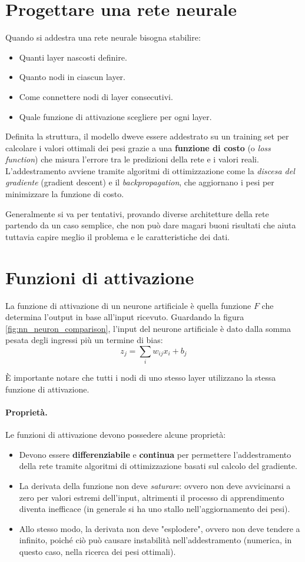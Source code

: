\section{Progettare una rete neurale}
Quando si addestra una rete neurale bisogna stabilire: 
\begin{itemize}
    \item Quanti layer nascosti definire.
    \item Quanto nodi in ciascun layer.
    \item Come connettere nodi di layer consecutivi.
    \item Quale funzione di attivazione scegliere per ogni layer.
\end{itemize}

Definita la struttura, il modello dweve essere addestrato su un training set per calcolare i valori ottimali dei pesi grazie a una \textbf{funzione di costo} (o \emph{loss function}) che misura l'errore tra le predizioni della rete e i valori reali. L'addestramento avviene tramite algoritmi di ottimizzazione come la \emph{discesa del gradiente} (gradient descent) e il \emph{backpropagation}, che aggiornano i pesi per minimizzare la funzione di costo.

Generalmente si va per tentativi, provando diverse architetture della rete partendo da un caso semplice, che non può dare magari buoni risultati che aiuta tuttavia  capire meglio il problema e le caratteristiche dei dati.

\section{Funzioni di attivazione}
La funzione di attivazione di un neurone artificiale è quella funzione $F$ che determina l'output in base all'input ricevuto. Guardando la figura \ref{fig:nn_neuron_comparison}, l'input del neurone artificiale è dato dalla somma pesata degli ingressi più un termine di bias:
\[
z_j = \sum_{i} w_{ij} x_i + b_j
\]

È importante notare che tutti i nodi di uno stesso layer utilizzano la stessa funzione di attivazione.

\paragraph{Proprietà.}
Le funzioni di attivazione devono possedere alcune proprietà:
\begin{itemize}
    \item Devono essere \textbf{differenziabile} e \textbf{continua} per permettere l'addestramento della rete tramite algoritmi di ottimizzazione basati sul calcolo del gradiente.
    \item La derivata della funzione non deve \emph{saturare}: ovvero non deve avvicinarsi a zero per valori estremi dell'input, altrimenti il processo di apprendimento diventa inefficace (in generale si ha uno stallo nell'aggiornamento dei pesi).
    \item Allo stesso modo, la derivata non deve "esplodere", ovvero non deve tendere a infinito, poiché ciò può causare instabilità nell'addestramento (numerica, in questo caso, nella ricerca dei pesi ottimali).
\end{itemize}


